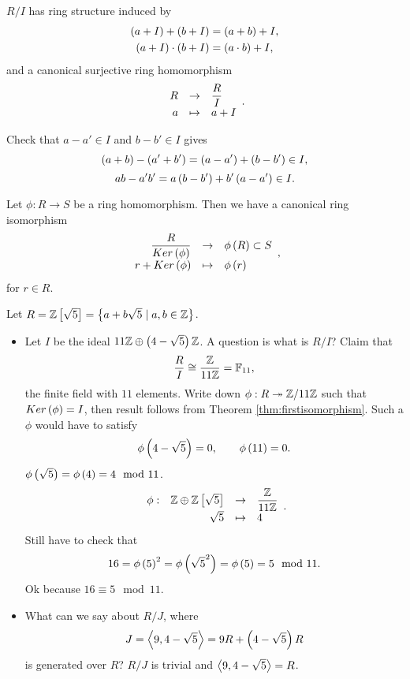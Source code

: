 \begin{proposition}
$ R / I $ has ring structure induced by
\begin{align*}
\left( a + I \right) + \left( b + I \right) & = \left( a + b \right) + I, \\
\left( a + I \right) \cdot \left( b + I \right) & = \left( a \cdot b \right) + I,
\end{align*}
and a canonical surjective ring homomorphism
$$ \function{R}{\dfrac{R}{I}}{a}{a + I}. $$
\end{proposition}

Check that $ a - a' \in I $ and $ b - b' \in I $ gives
$$ \left( a + b \right) - \left( a' + b' \right) = \left( a - a' \right) + \left( b - b' \right) \in I, $$
$$ ab - a'b' = a\left( b - b' \right) + b'\left( a - a' \right) \in I. $$

\begin{theorem}
\label{thm:firstisomorphism}
Let $ \phi : R \to S $ be a ring homomorphism. Then we have a canonical ring isomorphism
$$ \function{\dfrac{R}{Ker\rb{\phi}}}{\phi\rb{R} \subset S}{r + Ker\rb{\phi}}{\phi\rb{r}}, $$
for $ r \in R $.
\end{theorem}

\pagebreak

\begin{example*}
Let $ R = \mathbb{Z}\left[ \sqrt{5} \right] = \left\{ a + b\sqrt{5} \mid a, b \in \mathbb{Z} \right\} $.
\begin{itemize}
\item Let $ I $ be the ideal $ 11\mathbb{Z} \oplus \left( 4 - \sqrt{5} \right)\mathbb{Z} $. A question is what is $ R / I $? Claim that
$$ \dfrac{R}{I} \cong \dfrac{\mathbb{Z}}{11\mathbb{Z}} = \mathbb{F}_{11}, $$
the finite field with $ 11 $ elements. Write down $ \phi : R \twoheadrightarrow \mathbb{Z} / 11\mathbb{Z} $ such that $ Ker\left( \phi \right) = I $, then result follows from Theorem \ref{thm:firstisomorphism}. Such a $ \phi $ would have to satisfy
$$ \phi\left( 4 - \sqrt{5} \right) = 0, \qquad \phi\left( 11 \right) = 0. $$
$ \phi\left( \sqrt{5} \right) = \phi\left( 4 \right) = 4 \mod 11 $.
$$ \function[\phi]{\Z \oplus \Z\sb{\sqrt{5}}}{\dfrac{\Z}{11\Z}}{\sqrt{5}}{4}. $$
Still have to check that
$$ 16 = \phi\left( 5 \right)^2 = \phi\left( \sqrt{5}^2 \right) = \phi\left( 5 \right) = 5 \mod 11. $$
Ok because $ 16 \equiv 5 \mod 11 $.
\item What can we say about $ R / J $, where
$$ J = \left\langle 9, 4 - \sqrt{5} \right\rangle = 9R + \left( 4 - \sqrt{5} \right)R $$
is generated over $ R $? $ R / J $ is trivial and $ \left\langle 9, 4 - \sqrt{5} \right\rangle = R $.
\end{itemize}
\end{example*}

